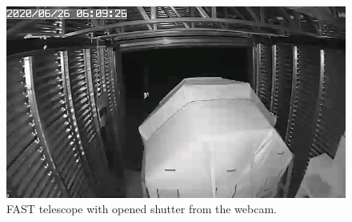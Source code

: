 \begin{figure}[H]
 \centering
 \includegraphics[scale = 0.5]{./pictures/operatinFast}
 \caption{FAST telescope with opened shutter from the webcam.}
 \label{FASTCam}
 
\end{figure}

 







